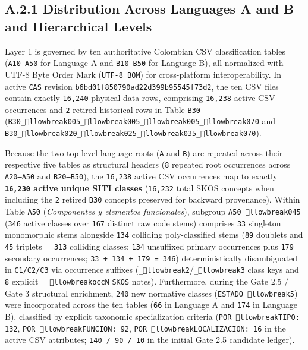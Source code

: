 \documentclass[10pt,a4paper]{article}
\begin{document}
\subsection*{A.2.1 Distribution Across Languages A and B and Hierarchical Levels}

Layer 1 is governed by ten authoritative Colombian CSV classification tables (\texttt{A10}--\texttt{A50} for Language A and \texttt{B10}--\texttt{B50} for Language B), all normalized with UTF-8 Byte Order Mark (\texttt{UTF-8 BOM}) for cross-platform interoperability. In active \texttt{CAS} revision \texttt{b6bd01f850790ad22d399b95545f73d2}, the ten CSV files contain exactly \texttt{16,240} physical data rows, comprising \texttt{16,238} active CSV occurrences and \texttt{2} retired historical rows in Table \texttt{B30} (\texttt{B30\_llowbreak{}005\_llowbreak{}005\_llowbreak{}005\_llowbreak{}070} and \texttt{B30\_llowbreak{}020\_llowbreak{}025\_llowbreak{}035\_llowbreak{}070}).

Because the two top-level language roots (\texttt{A} and \texttt{B}) are repeated across their respective five tables as structural headers (\texttt{8} repeated root occurrences across \texttt{A20--A50} and \texttt{B20--B50}), the \texttt{16,238} active CSV occurrences map to exactly \textbf{\texttt{16,230} active unique SITI classes} (\texttt{16,232} total SKOS concepts when including the \texttt{2} retired \texttt{B30} concepts preserved for backward provenance). Within Table \texttt{A50} (\textit{Componentes y elementos funcionales}), subgroup \texttt{A50\_llowbreak{}045} (\texttt{346} active classes over \texttt{167} distinct raw code stems) comprises \texttt{33} singleton monomorphic stems alongside \texttt{134} colliding poly-classified stems (\texttt{89} doublets and \texttt{45} triplets = \texttt{313} colliding classes: \texttt{134} unsuffixed primary occurrences plus \texttt{179} secondary occurrences; \texttt{33 + 134 + 179 = 346}) deterministically disambiguated in \texttt{C1/C2/C3} via occurrence suffixes (\texttt{\_llowbreak{}2}/\texttt{\_llowbreak{}3} class keys and \texttt{8} explicit \texttt{\_\_llowbreak{}occN} \texttt{SKOS} notes). Furthermore, during the Gate 2.5 / Gate 3 structural enrichment, \texttt{240} new normative classes (\texttt{ESTADO\_llowbreak{}5}) were incorporated across the ten tables (\texttt{66} in Language A and \texttt{174} in Language B), classified by explicit taxonomic specialization criteria (\texttt{POR\_llowbreak{}TIPO: 132}, \texttt{POR\_llowbreak{}FUNCION: 92}, \texttt{POR\_llowbreak{}LOCALIZACION: 16} in the active CSV attributes; \texttt{140 / 90 / 10} in the initial Gate 2.5 candidate ledger).
\end{document}
